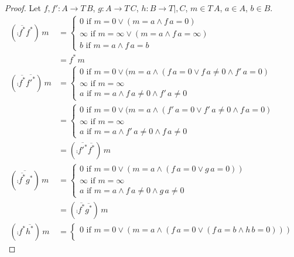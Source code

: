 \documentclass[runningheads,envcountsame]{llncs}
\begin{document}
\begin{proof}
    Let $f, f'\colon A \to T\,B$, $g\colon A \to T\,C$, $h\colon B \to T|,C$, $m \in T\,A$, $a \in A$, $b \in B$.
    \begin{align}
        (\comp{\overline{f^*}}{f^*})\,m &= \begin{cases}
            0 \text{ if } m = 0 \vee (m = a \wedge f\,a = 0) \\
            \infty \text{ if } m = \infty \vee (m = a \wedge f\,a = \infty) \\
            b \text{ if } m = a \wedge f\,a = b
        \end{cases} \\
        &= f^*\,m \\
        (\comp{\overline{f^*}}{\overline{f'^*}})\,m &= \begin{cases}
            0 \text{ if } m = 0 \vee (m = a \wedge (f\,a = 0 \vee f\,a \neq 0 \wedge f'\,a = 0) \\
            \infty \text{ if } m = \infty \\
            a \text{ if } m = a \wedge f\,a \neq 0 \wedge f'\,a \neq 0
        \end{cases} \\
        &= \begin{cases}
            0 \text{ if } m = 0 \vee (m = a \wedge (f'\,a = 0 \vee f'\,a \neq 0 \wedge f\,a = 0) \\
            \infty \text{ if } m = \infty \\
            a \text{ if } m = a \wedge f'\,a \neq 0 \wedge f\,a \neq 0
        \end{cases} \\
        &= (\comp{\overline{f'^*}}{\overline{f^*}})\,m \\
        (\overline{\comp{\overline{f^*}}{g^*}})\,m &= \begin{cases}
            0 \text{ if } m = 0 \vee (m = a \wedge (f\,a = 0 \vee g\,a = 0)) \\
            \infty \text{ if } m = \infty \\
            a \text{ if } m = a \wedge f\,a \neq 0 \wedge g\,a \neq 0
        \end{cases} \\
        &= (\comp{\overline{f^*}}{\overline{g^*}})\,m \\
        (\comp{f^*}{\overline{h^*}})\,m &= \begin{cases}
            0 \text{ if } m = 0 \vee (m = a \wedge (f\,a = 0 \vee (f\,a = b \wedge h\,b = 0))) \\

\end{cases}
\end{align}
\end{proof}
\end{document}
